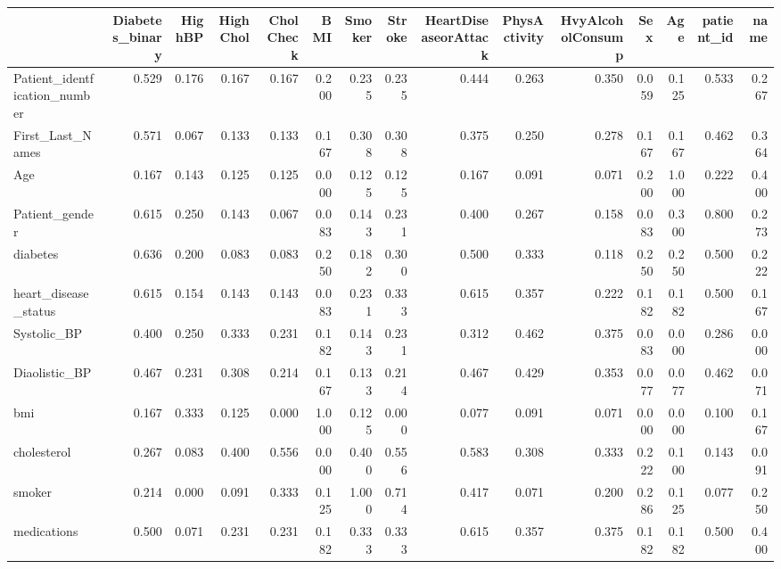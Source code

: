 \begin{tabular}{lrrrrrrrrrrrrrr}
\toprule
 & Diabetes_binary & HighBP & HighChol & CholCheck & BMI & Smoker & Stroke & HeartDiseaseorAttack & PhysActivity & HvyAlcoholConsump & Sex & Age & patient_id & name \\
\midrule
Patient_identfication_number & 0.529 & 0.176 & 0.167 & 0.167 & 0.200 & 0.235 & 0.235 & 0.444 & 0.263 & 0.350 & 0.059 & 0.125 & 0.533 & 0.267 \\
First_Last_Names & 0.571 & 0.067 & 0.133 & 0.133 & 0.167 & 0.308 & 0.308 & 0.375 & 0.250 & 0.278 & 0.167 & 0.167 & 0.462 & 0.364 \\
Age & 0.167 & 0.143 & 0.125 & 0.125 & 0.000 & 0.125 & 0.125 & 0.167 & 0.091 & 0.071 & 0.200 & 1.000 & 0.222 & 0.400 \\
Patient_gender & 0.615 & 0.250 & 0.143 & 0.067 & 0.083 & 0.143 & 0.231 & 0.400 & 0.267 & 0.158 & 0.083 & 0.300 & 0.800 & 0.273 \\
diabetes & 0.636 & 0.200 & 0.083 & 0.083 & 0.250 & 0.182 & 0.300 & 0.500 & 0.333 & 0.118 & 0.250 & 0.250 & 0.500 & 0.222 \\
heart_disease_status & 0.615 & 0.154 & 0.143 & 0.143 & 0.083 & 0.231 & 0.333 & 0.615 & 0.357 & 0.222 & 0.182 & 0.182 & 0.500 & 0.167 \\
Systolic_BP & 0.400 & 0.250 & 0.333 & 0.231 & 0.182 & 0.143 & 0.231 & 0.312 & 0.462 & 0.375 & 0.083 & 0.000 & 0.286 & 0.000 \\
Diaolistic_BP & 0.467 & 0.231 & 0.308 & 0.214 & 0.167 & 0.133 & 0.214 & 0.467 & 0.429 & 0.353 & 0.077 & 0.077 & 0.462 & 0.071 \\
bmi & 0.167 & 0.333 & 0.125 & 0.000 & 1.000 & 0.125 & 0.000 & 0.077 & 0.091 & 0.071 & 0.000 & 0.000 & 0.100 & 0.167 \\
cholesterol & 0.267 & 0.083 & 0.400 & 0.556 & 0.000 & 0.400 & 0.556 & 0.583 & 0.308 & 0.333 & 0.222 & 0.100 & 0.143 & 0.091 \\
smoker & 0.214 & 0.000 & 0.091 & 0.333 & 0.125 & 1.000 & 0.714 & 0.417 & 0.071 & 0.200 & 0.286 & 0.125 & 0.077 & 0.250 \\
medications & 0.500 & 0.071 & 0.231 & 0.231 & 0.182 & 0.333 & 0.333 & 0.615 & 0.357 & 0.375 & 0.182 & 0.182 & 0.500 & 0.400 \\
\bottomrule
\end{tabular}
